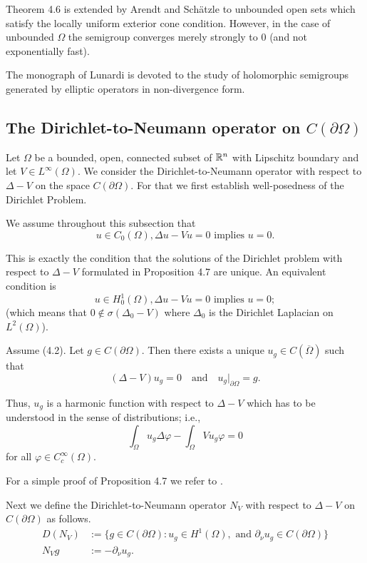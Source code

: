 Theorem 4.6 is extended by Arendt and Schätzle \cite{AS25} to unbounded open sets which satisfy the locally uniform exterior cone condition. However, in the case of unbounded $\Omega$ the semigroup converges merely strongly to $0$ (and not exponentially fast).

The monograph of Lunardi \cite{Lu95} is devoted to the study of holomorphic semigroups generated by elliptic operators in non-divergence form.
\subsection{The Dirichlet-to-Neumann operator on $C(\partial\Omega)$}
Let $\Omega$ be a bounded, open, connected subset of $\mathbb{R}^n$ with Lipschitz boundary and let $V \in L^\infty(\Omega)$. We consider the Dirichlet-to-Neumann operator with respect to $\Delta - V$ on the space $C(\partial\Omega)$. For that we first establish well-posedness of the Dirichlet Problem.

We assume throughout this subsection that
\begin{equation} \tag{4.2}
u \in C_0(\Omega), \Delta u - Vu = 0 \text{ implies } u = 0.
\end{equation}

This is exactly the condition that the solutions of the Dirichlet problem with respect to $\Delta - V$ formulated in Proposition 4.7 are unique. An equivalent condition is
\begin{equation} \tag{4.3}
u \in H^1_0(\Omega), \Delta u - Vu = 0 \text{ implies } u = 0;
\end{equation}
(which means that $0 \notin \sigma(\Delta_0 - V)$ where $\Delta_0$ is the Dirichlet Laplacian on $L^2(\Omega)$).

\begin{proposition}
Assume (4.2). Let $g \in C(\partial\Omega)$. Then there exists a unique $u_g \in C(\overline{\Omega})$ such that
\[(\Delta - V)u_g = 0 \quad \text{and} \quad u_g|_{\partial\Omega} = g.\]

Thus, $u_g$ is a harmonic function with respect to $\Delta - V$ which has to be understood in the sense of distributions; i.e.,
\[\int_\Omega u_g \Delta\varphi - \int_\Omega Vu_g \varphi = 0\]
for all $\varphi \in C_c^\infty(\Omega)$.
\end{proposition}

For a simple proof of Proposition 4.7 we refer to \cite{AtE19}.

Next we define the Dirichlet-to-Neumann operator $N_V$ with respect to $\Delta - V$ on $C(\partial\Omega)$ as follows.
\begin{align}
D(N_V) &:= \{g \in C(\partial\Omega) : u_g \in H^1(\Omega), \text{ and } \partial_\nu u_g \in C(\partial\Omega)\} \\
N_V g &:= -\partial_\nu u_g.
\end{align}

